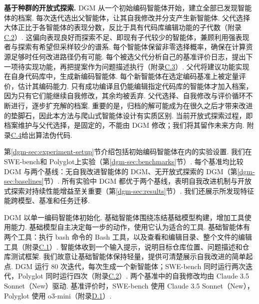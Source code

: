 \textbf{基于种群的开放式探索.} DGM 从一个初始编码智能体开始，建立全部已发现智能体的档案. 每次迭代选出父智能体，让其自我修改并分支产生新智能体. 父代选择大体正比于各智能体的表现分数，反比于具有代码库编辑功能的子代数（附录\hyperref[dgm-app:parent-select]{C.2}）. 这偏向表现良好而探索不足、即现有子代较少的智能体，兼顾利用强表现者与探索有希望但采样较少的谱系. 每个智能体保留非零选择概率，确保在计算资源足够时任何改进路径仍有可能. 每个被选父代分析自己的基准评价日志，提出下一项待实现功能，再把提案作为问题描述执行（附录\hyperref[dgm-app:selfimprove-prompts]{C.3}）. 父代将建议功能实现在自身代码库中，生成新编码智能体. 每个新智能体在选定编码基准上被定量评价，估计其编码能力. 只有成功编译且仍能编辑指定代码库的智能体才加入档案，因为只有它们能继续自我修改，其余均被丢弃. 父代选择、自我修改与评价循环不断进行，逐步扩充解的档案. 重要的是，归档的解可能成为在很久之后才带来改进的垫脚石，因此本方法与爬山式智能体设计\cite{dgm-robeyns2025self}有实质区别. 当前开放式探索过程，即档案维护与父代选择，是固定的，不能由 DGM 修改；我们将其留作未来方向. 附录\hyperref[dgm-app:pseudocode]{C.4}给出算法伪代码.

第\ref{dgm-sec:experiment-setup}节介绍包括初始编码智能体在内的实验设置. 我们在 SWE-bench\cite{dgm-jimenez2024swebench}和 Polyglot\cite{dgm-gauthier2024polyglot}上实验（第\ref{dgm-sec:benchmarks}节）. 每个基准均比较 DGM 与两个基线：无自我改进智能体的 DGM、无开放式探索的 DGM（第\ref{dgm-sec:baselines}节）. 所有实验中 DGM 都优于两个基线，表明自我改进机制与开放式探索对持续性能增益至关重要（第\ref{dgm-sec:results}节）. 我们还展示所发现特征能跨模型、基准和任务迁移.

DGM 以单一编码智能体初始化. 基础智能体围绕冻结基础模型构建，增加工具使用能力\cite{dgm-schick2023toolformer,dgm-anthropic_tool_use_2024}. 基础模型自主决定每一步的动作，使用它认为适合的工具. 基础智能体有两个工具：执行 bash 命令的 Bash 工具，以及查看和编辑目录、整个文件的编辑工具（附录\hyperref[dgm-app:initial-agent]{C.1}）. 智能体收到一个输入提示，说明目标仓库位置、问题描述和仓库测试框架. 我们故意让基础智能体保持轻量，提供可清楚展示自我改进的简单起点. DGM 运行 80 次迭代，每次生成一个新智能体；SWE-bench 同时运行两次迭代，Polyglot 同时运行四次（附录\hyperref[dgm-app:parent-select]{C.2}）. 两个基准中的自我修改均由 Claude 3.5 Sonnet（New）\cite{dgm-anthropic2024claude35sonnet}驱动. 基准评价时，SWE-bench 使用 Claude 3.5 Sonnet（New），Polyglot 使用 o3-mini\cite{dgm-openai2025o3mini}（附录\hyperref[dgm-app:fm-hyperparam]{D.1}）.

